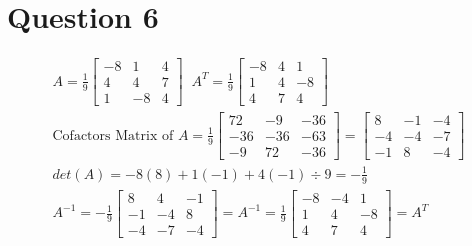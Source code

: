 \documentclass[12pt, a4paper]{article}
\begin{document}
\section{Question 6}
\begin{gather*}
  A = \frac{1}{9}
  \left[ \begin{array}{ccc}
    -8 & 1 & 4 \\
    4 & 4 & 7 \\
    1 & -8 & 4
  \end{array} \right] \; \;
  A^T = \frac{1}{9}
  \left[ \begin{array}{ccc}
    -8 & 4 & 1 \\
    1 & 4 & -8 \\
    4 & 7 & 4
  \end{array} \right] \\[5pt]
  \text{Cofactors Matrix of } A = 
  \frac{1}{9}
  \left[ \begin{array}{ccc}
    72 & -9 & -36 \\
    -36 & -36 & -63 \\
    -9 & 72 & -36
  \end{array} \right] =
  \left[ \begin{array}{ccc}
    8 & -1 & -4 \\
    -4 & -4 & -7 \\
    -1 & 8 & -4
  \end{array} \right] \\[5pt]
  det(A) = -8(8) + 1(-1) + 4(-1) \div 9 = -\frac{1}{9}\\[5pt]
  A^{-1} = -\frac{1}{9}
  \left[ \begin{array}{ccc}
    8 & 4 & -1 \\
    -1 & -4 & 8 \\
    -4 & -7 & -4
  \end{array} \right] = 
  A^{-1} = \frac{1}{9}
  \left[ \begin{array}{ccc}
    -8 & -4 & 1 \\
    1 & 4 & -8 \\
    4 & 7 & 4
  \end{array} \right] = A^T
\end{gather*}
\end{document}
